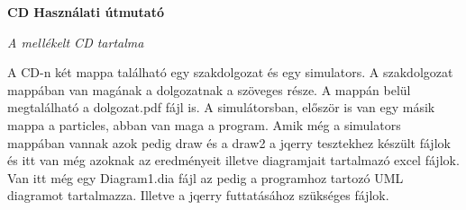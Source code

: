 \pagestyle{empty}

\noindent \textbf{\Large CD Használati útmutató}

\vskip 1cm

\textit{A mellékelt CD tartalma} 

A CD-n két mappa található egy szakdolgozat és egy simulators. A szakdolgozat mappában van magának a dolgozatnak a szöveges része. A mappán belül megtalálható a dolgozat.pdf fájl is. A simulátorsban, először is van egy másik mappa a particles, abban van maga a program. Amik még a simulators mappában vannak azok pedig draw és a draw2 a jqerry tesztekhez készült fájlok és itt van még azoknak az eredményeit illetve diagramjait tartalmazó excel fájlok. Van itt még egy Diagram1.dia fájl az pedig a programhoz tartozó UML diagramot tartalmazza. Illetve a jqerry futtatásához szükséges fájlok. 